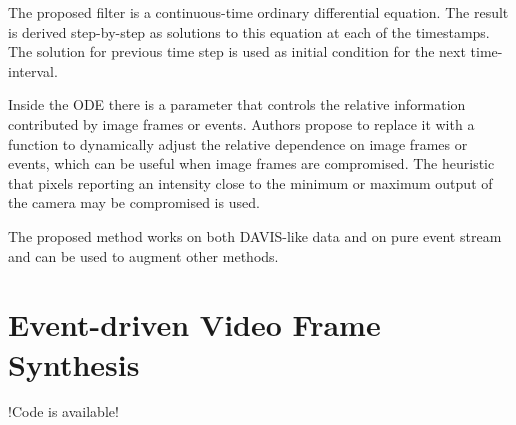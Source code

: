 \documentclass[10pt,a4paper]{article}
\begin{document}
The proposed filter is a continuous-time ordinary differential equation. The result is derived step-by-step as solutions to this equation at each of the timestamps. 
The solution for previous time step is used as initial condition for the next time-interval.

Inside the ODE there is a parameter that controls the relative information contributed by image frames or events. 
Authors propose to replace it with a function to dynamically adjust the relative dependence on image frames or events, which can be useful when image frames are compromised.
The heuristic that pixels reporting an intensity close to the minimum or maximum output of the camera may be compromised is used.

The proposed method works on both DAVIS-like data and on pure event stream and can be used to augment other methods.

\section{Event-driven Video Frame Synthesis}
!Code is available!
\end{document}
